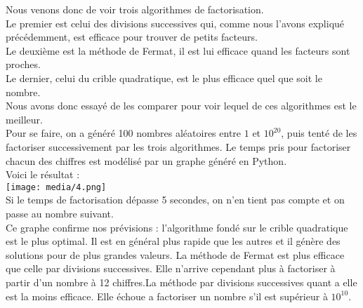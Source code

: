 Nous venons donc de voir trois algorithmes de factorisation.\\
Le premier est celui des divisions successives qui, comme nous l’avons expliqué précédemment, est efficace
pour trouver de petits facteurs.\\
Le deuxième est la méthode de Fermat, il est lui efficace quand les facteurs sont proches. \\
Le dernier, celui du crible quadratique, est le plus efficace quel que soit le nombre.\\
Nous avons donc essayé de les comparer pour voir lequel de ces algorithmes est le meilleur. \\
Pour se faire, on a généré 100 nombres aléatoires entre $1$ et $10^{20}$, puis tenté de les factoriser successivement par les
trois algorithmes. Le temps pris pour factoriser chacun des chiffres est modélisé par un graphe généré en Python. \\

Voici le résultat :\\
\texttt{[image: media/4.png]}\\
Si le temps de factorisation dépasse 5 secondes, on n’en tient pas compte et on passe au nombre suivant. \\
Ce graphe confirme nos prévisions : l’algorithme fondé sur le crible quadratique est le plus optimal. Il est en général plus rapide que les autres et il génère des solutions pour de plus grandes valeurs.
La méthode de Fermat est plus efficace que celle par divisions successives. Elle n'arrive cependant plus à factoriser à partir d’un nombre à 12 chiffres.La méthode par divisions successives quant a elle est la moins efficace. Elle échoue a factoriser un nombre s'il est supérieur à $10^{10}$.
